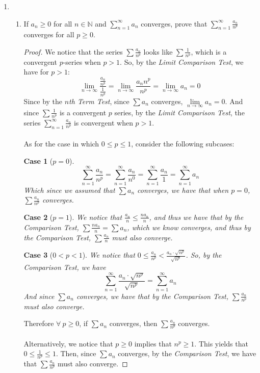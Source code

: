 \documentclass[12pt,letterpaper]{article}
\newcommand{\limx}[2]{\displaystyle\lim\limits_{#1 \to #2}}
\newcommand{\N}{\mathbb{N}}
\theoremstyle{case}
\newtheorem{case}{Case}
\theoremstyle{definition}
\begin{document}
\begin{enumerate}
		\item 
		\begin{enumerate}
			\item  If $a_n \geq 0$ for all $n \in \N$ and $\displaystyle\sum_{n=1}^{\infty} a_n$ converges, prove that $\displaystyle\sum_{n=1}^{\infty}\frac{a_n}{n^p}$ converges for all $p \geq 0$.
			\begin{proof}
				We notice that the series $\displaystyle\sum \frac{a_n}{n^p}$ looks like $\displaystyle\sum \frac{1}{n^p}$, which is a convergent $p$-series when $p > 1$. So, by the \textit{Limit Comparison Test}, we have for $p >1$:
					\[\limx{n}{\infty} \frac{\frac{a_n}{n^p}}{\frac{1}{n^p}}=\limx{n}{\infty} \frac{a_nn^p}{n^p} = \limx{n}{\infty} a_n = 0\] 
				Since by the \textit{$n$th Term Test}, since $\sum a_n$ converges, $\limx{n}{\infty} a_n = 0$. And since $\sum \frac{1}{n^p}$ is a convergent $p$ series, by the \textit{Limit Comparison Test}, the series $\displaystyle\sum_{n=1}^{\infty} \frac{a_n}{n^p}$ is convergent when $p > 1$.
				\\\\As for the case in which $0 \leq p \leq 1$, consider the following subcases:
				\begin{case}[$p=0$]
					\[\sum_{n=1}^{\infty} \frac{a_n}{n^p} = \sum_{n=1}^{\infty} \frac{a_n}{n^0} = \sum_{n=1}^{\infty} \frac{a_n}{1} = \sum_{n=1}^{\infty} a_n\]
					Which since we assumed that $\sum a_n$ converges, we have that when $p=0$, $\sum \frac{a_n}{n^p}$ converges.
				\end{case}
				\begin{case}[$p=1$] We notice that $\frac{a_n}{n} \leq \frac{na_n}{n}$, and thus we have that by the \textit{Comparison Test}, $\sum \frac{na_n}{n} = \sum a_n$, which we know converges, and thus by the \textit{Comparison Test}, $\sum \frac{a_n}{n}$ must also converge.
				\end{case}
				\begin{case}[$0<p<1$]
					We notice that $0\leq\frac{a_n}{n^p} < \frac{a_n\cdot \sqrt{n^p}}{\sqrt{n^p}}$. So, by the \textit{Comparison Test}, we have
					\[\sum_{n=1}^{\infty} \frac{a_n \cdot \sqrt{n^p}}{\sqrt{n^p}} = \sum_{n=1}^{\infty} a_n\]
					And since $\sum a_n$ converges, we have that by the \textit{Comparison Test}, $\sum \frac{a_n}{n^p}$ must also converge.
				\end{case}
			Therefore $\forall\ p \geq 0$, if $\sum a_n$ converges, then $\sum \frac{a_n}{n^p}$ converges.
			\\\\Alternatively, we notice that $p \geq 0$ implies that $n^p \geq 1$. This yields that $0 \leq \frac{1}{n^p} \leq 1$. Then, since $\sum a_n$ converges, by the \textit{Comparison Test}, we have that $\sum \frac{a_n}{n^p}$ must also converge.
			\end{proof}
			

\end{enumerate}
\end{enumerate}
\end{document}
